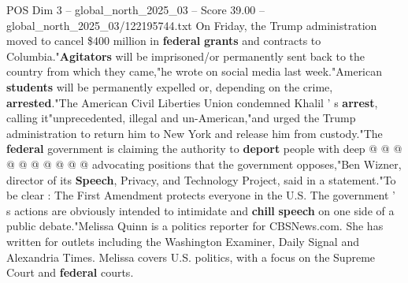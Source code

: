 \begin{textsample}{POS Dim 3 – global\_north\_2025\_03 – Score 39.00 – global\_north\_2025\_03/122195744.txt}
On Friday, the Trump administration moved to cancel \$400 million in \textbf{federal} \textbf{grants} and contracts to Columbia."\textbf{Agitators} will be imprisoned/or permanently sent back to the country from which they came,"he wrote on social media last week."American \textbf{students} will be permanently expelled or, depending on the crime, \textbf{arrested}."The American Civil Liberties Union condemned Khalil ' s \textbf{arrest}, calling it"unprecedented, illegal and un-American,"and urged the Trump administration to return him to New York and release him from custody."The \textbf{federal} government is claiming the authority to \textbf{deport} people with deep @ @ @ @ @ @ @ @ @ @ advocating positions that the government opposes,"Ben Wizner, director of its \textbf{Speech}, Privacy, and Technology Project, said in a statement."To be clear : The First Amendment protects everyone in the U.S.
The government ' s actions are obviously intended to intimidate and \textbf{chill} \textbf{speech} on one side of a public debate."Melissa Quinn is a politics reporter for CBSNews.com.
She has written for outlets including the Washington Examiner, Daily Signal and Alexandria Times.
Melissa covers U.S. politics, with a focus on the Supreme Court and \textbf{federal} courts.

\end{textsample}
